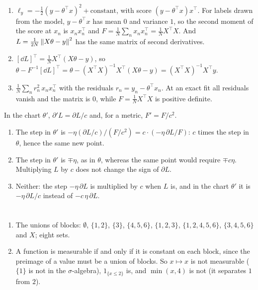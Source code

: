 \begin{enumerate}[nosep]
  \item $\ell_y = -\frac12(y - \theta^\top x)^2 + \text{constant}$, with
        score $(y - \theta^\top x)x^\top$. For labels drawn from the
        model, $y - \theta^\top x$ has mean $0$ and variance $1$, so the
        second moment of the score at $x_n$ is $x_nx_n^\top$ and
        $F = \frac1N\sum_nx_nx_n^\top = \frac1NX^\top X$. And
        $L = \frac1{2N}\left\|X\theta - y\right\|^2$ has the same matrix of
        second derivatives.
  \item $[\dd L]^\top = \frac1NX^\top(X\theta - y)$, so
        $\theta - F^{-1}[\dd L]^\top
        = \theta - (X^\top X)^{-1}X^\top(X\theta - y)
        = (X^\top X)^{-1}X^\top y$.
  \item $\frac1N\sum_nr_n^2\,x_nx_n^\top$ with the residuals
        $r_n = y_n - \theta^\top x_n$. At an exact fit all residuals
        vanish and the matrix is $0$, while $F = \frac1NX^\top X$ is
        positive definite.
\end{enumerate}

In the chart $\theta'$, $\partial'L = \partial L/c$ and, for a metric,
$F' = F/c^2$.
\begin{enumerate}[nosep]
  \item The step in $\theta'$ is $-\eta(\partial L/c)/(F/c^2)
        = c\cdot(-\eta\,\partial L/F)$: $c$ times the step in $\theta$,
        hence the same new point.
  \item The step in $\theta'$ is $\mp\eta$, as in $\theta$, whereas the
        same point would require $\mp c\eta$. Multiplying $L$ by $c$
        does not change the sign of $\partial L$.
  \item Neither: the step $-\eta\,\partial L$ is multiplied by $c$ when
        $L$ is, and in the chart $\theta'$ it is $-\eta\,\partial L/c$
        instead of $-c\,\eta\,\partial L$.
\end{enumerate}

\section{}

\begin{enumerate}[nosep]
  \item The unions of blocks: $\emptyset$, $\{1, 2\}$, $\{3\}$,
        $\{4, 5, 6\}$, $\{1, 2, 3\}$, $\{1, 2, 4, 5, 6\}$,
        $\{3, 4, 5, 6\}$ and $X$; eight sets.
  \item A function is measurable if and only if it is constant on each
        block, since the preimage of a value must be a union of blocks.
        So $x\mapsto x$ is not measurable ($\{1\}$ is not in the
        $\sigma$-algebra), $1_{\{x\leq2\}}$ is, and $\min(x, 4)$ is not
        (it separates $1$ from $2$).
\end{enumerate}

